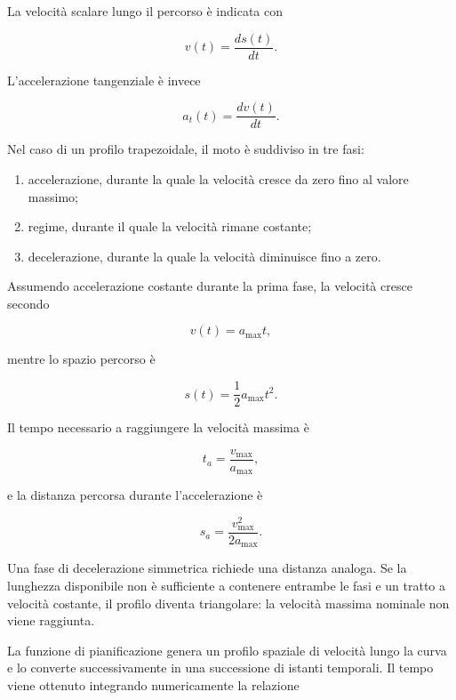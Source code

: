 La velocità scalare lungo il percorso è indicata con

\begin{equation}
    v(t)=\frac{ds(t)}{dt}.
\end{equation}

L'accelerazione tangenziale è invece

\begin{equation}
    a_t(t)=\frac{dv(t)}{dt}.
\end{equation}

Nel caso di un profilo trapezoidale, il moto è suddiviso in tre fasi:
\begin{enumerate}
    \item accelerazione, durante la quale la velocità cresce da zero fino al valore massimo;
    \item regime, durante il quale la velocità rimane costante;
    \item decelerazione, durante la quale la velocità diminuisce fino a zero.
\end{enumerate}

Assumendo accelerazione costante durante la prima fase, la velocità cresce secondo

\begin{equation}
    v(t)=a_{\max}t,
\end{equation}

mentre lo spazio percorso è

\begin{equation}
    s(t)=\frac{1}{2}a_{\max}t^2.
\end{equation}

Il tempo necessario a raggiungere la velocità massima è

\begin{equation}
    t_a=\frac{v_{\max}}{a_{\max}},
\end{equation}

e la distanza percorsa durante l'accelerazione è

\begin{equation}
    s_a=\frac{v_{\max}^2}{2a_{\max}}.
\end{equation}

Una fase di decelerazione simmetrica richiede una distanza analoga. Se la lunghezza disponibile non è sufficiente a contenere entrambe le fasi e un tratto a velocità costante, il profilo diventa triangolare: la velocità massima nominale non viene raggiunta.

La funzione di pianificazione genera un profilo spaziale di velocità lungo la curva e lo converte successivamente in una successione di istanti temporali. Il tempo viene ottenuto integrando numericamente la relazione


